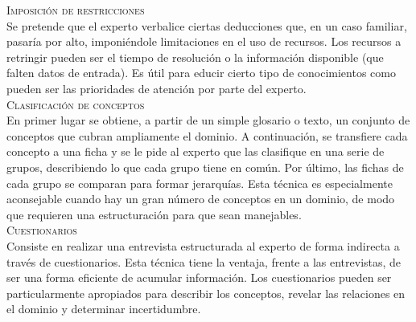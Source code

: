 \documentclass[12pt]{article}
\begin{document}
\textsc{Imposición de restricciones}\\
Se pretende que el experto verbalice ciertas deducciones que, en un caso familiar, pasaría por alto, imponiéndole limitaciones en el uso de recursos. Los recursos a retringir pueden ser el tiempo de resolución o la información disponible (que falten datos de entrada). Es útil para educir cierto tipo de conocimientos como pueden ser las prioridades de atención por parte del experto.\\

\textsc{Clasificación de conceptos}\\
En primer lugar se obtiene, a partir de un simple glosario o texto, un conjunto de conceptos que cubran ampliamente el dominio. A continuación, se transfiere cada concepto a una ficha y se le pide al experto que las clasifique en una serie de grupos, describiendo lo que cada grupo tiene en común. Por último, las fichas de cada grupo se comparan para formar jerarquías. Esta técnica es especialmente aconsejable cuando hay un gran número de conceptos en un dominio, de modo que requieren una estructuración para que sean manejables.\\

\textsc{Cuestionarios}\\
Consiste en realizar una entrevista estructurada al experto de forma indirecta a través de cuestionarios. Esta técnica tiene la ventaja, frente a las entrevistas, de ser una forma eficiente de acumular información. Los cuestionarios pueden ser particularmente apropiados para describir los conceptos, revelar las relaciones en el dominio y determinar incertidumbre.
\end{document}
